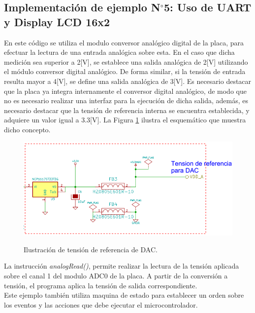 \documentclass[12pt,letterpaper]{article}
\begin{document}
\subsection{Implementación de ejemplo N$^{\circ}$5: Uso de UART y Display LCD 16x2}\label{sec:ej5sapi}
En este código se utiliza el modulo conversor analógico digital de la placa, para efectuar la lectura de una entrada analógica sobre esta. En el caso que dicha medición sea superior a 2[V], se establece una salida analógica de 2[V] utilizando el módulo conversor digital analógico. De forma similar, si la tensión de entrada resulta mayor a 4[V], se define una salida analógica de 3[V].
Es necesario destacar que la placa ya integra internamente el conversor digital analógico, de modo que no es necesario realizar una interfaz para la ejecución de dicha salida, además, es necesario destacar que la tensión de referencia interna se encuentra establecida, y adquiere un valor igual a 3.3[V]. La Figura \ref{Fig26} ilustra el esquemático que muestra dicho concepto.


\begin{figure}[H]
\centering
\includegraphics[width=8 cm]{figuras/f8.png}\\
\caption{Ilustración de tensión de referencia de DAC.}
\label{Fig26}
\end{figure}


La instrucción \textit{analogRead()}, permite realizar la lectura de la tensión aplicada sobre el canal 1 del modulo ADC0 de la placa. A partir de la conversión a tensión, el programa aplica la tensión de salida correspondiente.
 \\
 
Este ejemplo también utiliza maquina de estado para establecer un orden sobre los eventos y las acciones que debe ejecutar el microcontrolador.
\end{document}

